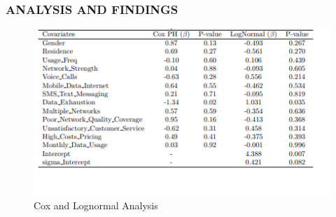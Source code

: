 \documentclass{beamer}
\begin{document}
	\begin{frame}
		\frametitle{ANALYSIS AND FINDINGS}
		\begin{figure}
			\centering
			\includegraphics[width=0.75\linewidth]{Presentation/cox and weilbull.png}
			\caption{Cox and Lognormal Analysis}
			\label{Figure 2}
		\end{figure}
	\end{frame}
	
\end{document}
